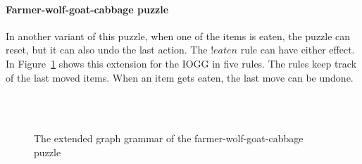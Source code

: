 \paragraph*{Farmer-wolf-goat-cabbage puzzle}
In another variant of this puzzle, when one of the items is eaten, the puzzle can reset, but it can also undo the last action. The $\mathit{!eaten}$ rule can have either effect. In Figure~\ref{fig:gg-fwgc-extended} shows this extension for the IOGG in five rules. The rules keep track of the last moved items. When an item gets eaten, the last move can be undone.

\begin{figure}[ht]
  \begin{center}
     \hspace{20px}
    \subfloat[?c]{\label{fig:c-fwgc-extended}} \\
    \subfloat[?g]{\label{fig:g-fwgc-extended}} \hspace{20px}
    \subfloat[?w]{\label{fig:w-fwgc-extended}} \\
    \subfloat[?n]{\label{fig:n-fwgc-extended}}
  \end{center}
  \caption{The extended graph grammar of the farmer-wolf-goat-cabbage puzzle}
  \label{fig:gg-fwgc-extended}
\end{figure}


